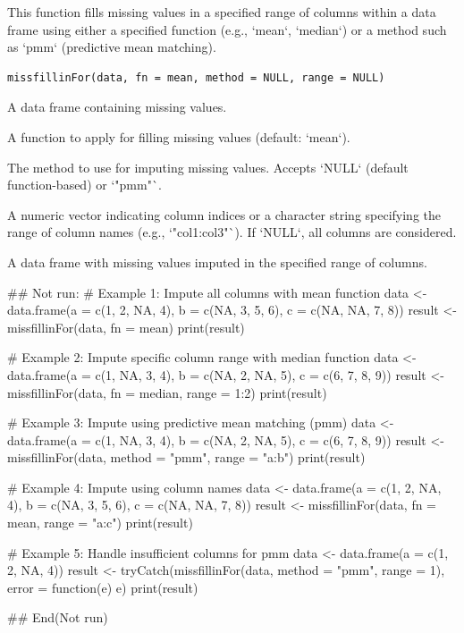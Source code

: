 \documentclass[a4paper]{book}
\begin{document}
%
\begin{Description}
This function fills missing values in a specified range of columns within a data frame using either
a specified function (e.g., `mean`, `median`) or a method such as `pmm` (predictive mean matching).
\end{Description}
%
\begin{Usage}
\begin{verbatim}
missfillinFor(data, fn = mean, method = NULL, range = NULL)
\end{verbatim}
\end{Usage}
%
\begin{Arguments}
\begin{ldescription}
\item[\code{data}] A data frame containing missing values.

\item[\code{fn}] A function to apply for filling missing values (default: `mean`).

\item[\code{method}] The method to use for imputing missing values. Accepts `NULL` (default function-based) or `"pmm"`.

\item[\code{range}] A numeric vector indicating column indices or a character string specifying the range of column names (e.g., `"col1:col3"`).
If `NULL`, all columns are considered.
\end{ldescription}
\end{Arguments}
%
\begin{Value}
A data frame with missing values imputed in the specified range of columns.
\end{Value}
%
\begin{Examples}
\begin{ExampleCode}
## Not run: 
# Example 1: Impute all columns with mean function
data <- data.frame(a = c(1, 2, NA, 4), b = c(NA, 3, 5, 6), c = c(NA, NA, 7, 8))
result <- missfillinFor(data, fn = mean)
print(result)

# Example 2: Impute specific column range with median function
data <- data.frame(a = c(1, NA, 3, 4), b = c(NA, 2, NA, 5), c = c(6, 7, 8, 9))
result <- missfillinFor(data, fn = median, range = 1:2)
print(result)

# Example 3: Impute using predictive mean matching (pmm)
data <- data.frame(a = c(1, NA, 3, 4), b = c(NA, 2, NA, 5), c = c(6, 7, 8, 9))
result <- missfillinFor(data, method = "pmm", range = "a:b")
print(result)

# Example 4: Impute using column names
data <- data.frame(a = c(1, 2, NA, 4), b = c(NA, 3, 5, 6), c = c(NA, NA, 7, 8))
result <- missfillinFor(data, fn = mean, range = "a:c")
print(result)

# Example 5: Handle insufficient columns for pmm
data <- data.frame(a = c(1, 2, NA, 4))
result <- tryCatch(missfillinFor(data, method = "pmm", range = 1), error = function(e) e)
print(result)

## End(Not run)
\end{ExampleCode}
\end{Examples}
\end{document}
